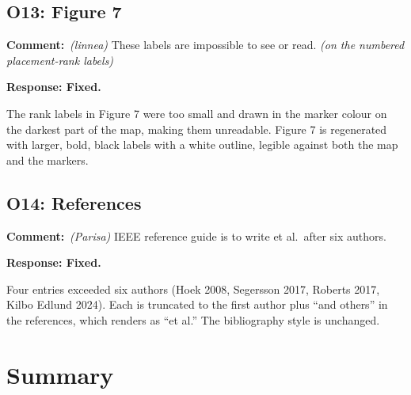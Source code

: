 \documentclass[11pt,a4paper]{article}
\newcommand{\rjcomment}[1]{\par\noindent\textbf{Comment:}\ #1\par}
\newcommand{\rjresponse}[1]{\par\noindent\textbf{Response: #1}\par}
\begin{document}
\subsection{O13: Figure 7}

\rjcomment{\emph{(linnea)} These labels are impossible to see or read. \emph{(on the numbered
placement-rank labels)}}

\rjresponse{Fixed.}
The rank labels in Figure 7 were too small and drawn in the marker colour on the darkest part of
the map, making them unreadable. Figure 7 is regenerated with larger, bold, black labels with a
white outline, legible against both the map and the markers.

\subsection{O14: References}

\rjcomment{\emph{(Parisa)} IEEE reference guide is to write et al.\ after six authors.}

\rjresponse{Fixed.}
Four entries exceeded six authors (Hoek 2008, Segersson 2017, Roberts 2017, Kilbo Edlund 2024).
Each is truncated to the first author plus ``and others'' in the references, which renders as
``et al.'' The bibliography style is unchanged.

\section{Summary}
\end{document}

